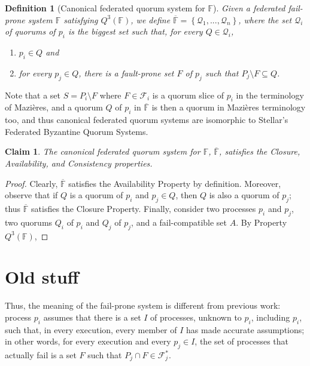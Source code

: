 \documentclass[11pt]{article}
\newtheorem{definition}{Definition}
\newtheorem{claim}{Claim}
\begin{document}
\begin{definition}[Canonical federated quorum system for $\mathbb{F}$]
Given a federated fail-prone system $\mathbb{F}$ satisfying $Q^3(\mathbb{F})$, we define $\overline{\mathbb{F}}=\left\{\mathcal{Q}_1,...,\mathcal{Q}_n\right\}$, where the set $\mathcal{Q}_i$ of quorums of $p_i$ is the biggest set such that, for every $Q\in\mathcal{Q}_i$,
\begin{enumerate}
  \item $p_i\in Q$ and
  \item for every $p_j\in Q$, there is a fault-prone set $F$ of $p_j$ such that $P_j\setminus F\subseteq Q$.
\end{enumerate}
\end{definition}
Note that a set $S=P_i\setminus F$ where $F\in\mathcal{F}_i$ is a quorum slice of $p_i$ in the terminology of Mazières, and a quorum $Q$ of $p_i$ in $\overline{\mathbb{F}}$ is then a quorum in Mazières terminology too, and thus canonical federated quorum systems are isomorphic to Stellar's Federated Byzantine Quorum Systems.

\begin{claim}
 The canonical federated quorum system for $\mathbb{F}$, $\overline{\mathbb{F}}$, satisfies the Closure, Availability, and Consistency properties.
\end{claim}
\begin{proof}
  Clearly, $\overline{\mathbb{F}}$  satisfies the Availability Property by definition. Moreover, observe that if $Q$ is a quorum of $p_i$ and $p_j\in Q$, then $Q$ is also a quorum of $p_j$; thus $\overline{\mathbb{F}}$ satisfies the Closure Property. Finally, consider two processes $p_i$ and $p_j$, two quorums $Q_i$ of $p_i$ and $Q_j$ of $p_j$, and a fail-compatible set $A$. By Property $Q^3(\mathbb{F})$,
\end{proof}

\section{Old stuff}


Thus, the meaning of the fail-prone system is different from previous work: process $p_i$ assumes that there is a set $I$ of processes, unknown to $p_i$, including $p_i$, such that, in every execution, every member of $I$ has made accurate assumptions; in other words, for every execution and every $p_j\in I$, the set of processes that actually fail is a set $F$ such that $P_j\cap F \in \mathcal{F}_j^*$.
\end{document}
